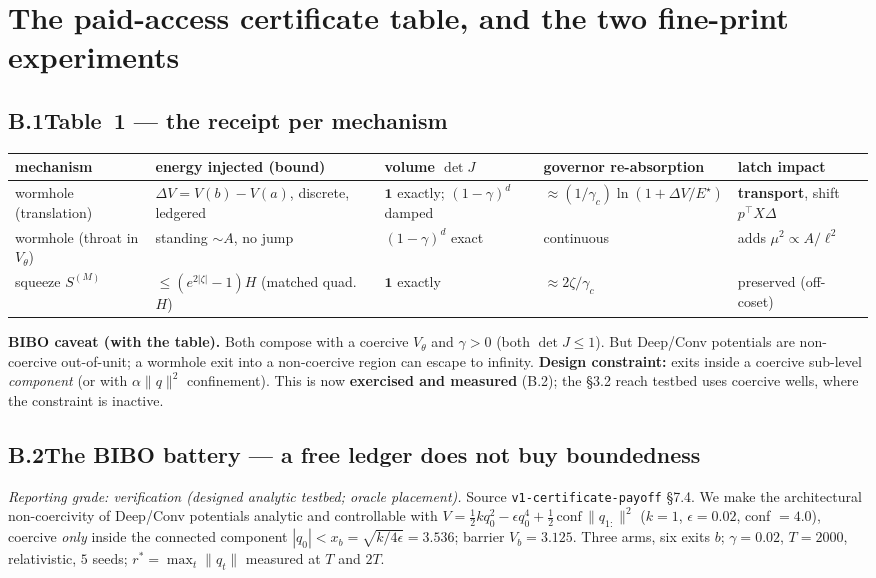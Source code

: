 \documentclass[11pt]{article}
\newcommand{\half}{\tfrac12}
\newcommand{\detJ}{\det J}
\begin{document}
\section{The paid-access certificate table, and the two fine-print experiments}
\subsection*{B.1\quad Table~1 --- the receipt per mechanism}
\begin{center}\footnotesize
\begin{tabular}{p{2.6cm}p{2.3cm}p{1.8cm}p{3.0cm}p{2.5cm}}
\toprule
mechanism & energy injected (bound) & volume $\detJ$ & governor re-absorption & latch impact \\
\midrule
wormhole (translation) & $\Delta V{=}V(b){-}V(a)$, discrete, ledgered & $\mathbf{1}$ exactly; $(1{-}\gamma)^d$ damped & $\approx(1/\gamma_c)\ln(1{+}\Delta V/E^\star)$ & \textbf{transport}, shift $p^\top X\Delta$ \\
wormhole (throat in $V_\theta$) & standing $\sim A$, no jump & $(1{-}\gamma)^d$ exact & continuous & adds $\mu^2{\propto}A/\ell^2$ \\
squeeze $S^{(M)}$ & $\le(e^{2|\zeta|}{-}1)H$ (matched quad.\ $H$) & $\mathbf{1}$ exactly & $\approx2\zeta/\gamma_c$ & preserved (off-coset) \\
\bottomrule
\end{tabular}
\end{center}
\textbf{BIBO caveat (with the table).} Both compose with a coercive $V_\theta$ and $\gamma>0$ (both $\detJ\le1$). But Deep/Conv potentials are non-coercive out-of-unit; a wormhole exit into a non-coercive region can escape to infinity. \textbf{Design constraint:} exits inside a coercive sub-level \emph{component} (or with $\alpha\|q\|^2$ confinement). This is now \textbf{exercised and measured} (B.2); the \S3.2 reach testbed uses coercive wells, where the constraint is inactive.

\subsection*{B.2\quad The BIBO battery --- a free ledger does not buy boundedness}
\emph{Reporting grade: verification (designed analytic testbed; oracle placement).} Source \texttt{v1-certificate-payoff} \S7.4. We make the architectural non-coercivity of Deep/Conv potentials analytic and controllable with $V=\half kq_0^2-\epsilon q_0^4+\half\,\mathrm{conf}\,\|q_{1:}\|^2$ ($k=1$, $\epsilon=0.02$, conf $=4.0$), coercive \emph{only} inside the connected component $|q_0|<x_b=\sqrt{k/4\epsilon}=3.536$; barrier $V_b=3.125$. Three arms, six exits $b$; $\gamma=0.02$, $T=2000$, relativistic, $5$ seeds; $r^\ast=\max_t\|q_t\|$ measured at $T$ and $2T$.
\end{document}
